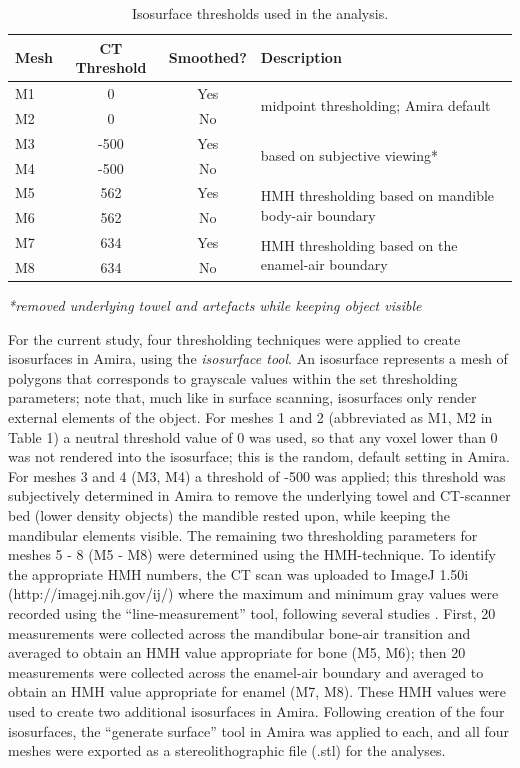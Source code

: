 \documentclass[review]{elsarticle}
\begin{document}
\begin{table}[tbh]\centering
\footnotesize
\caption{Isosurface thresholds used in the analysis.}
\centering
\begin{tabular}{lccp{6cm}}
\hline
Mesh & CT Threshold & Smoothed? & Description\\
\hline
M1 & 0 & Yes & \multirow{2}{5cm}{midpoint thresholding; Amira default}\\
M2 & 0 & No & \\
M3 & -500 & Yes & \multirow{2}{5cm}{based on subjective viewing*}\\
M4 & -500 & No & \\
M5 & 562 & Yes & \multirow{2}{5cm}{HMH thresholding based on mandible body-air boundary}\\
M6 & 562 & No & \\
M7 & 634 & Yes & \multirow{2}{5cm}{HMH thresholding based on the enamel-air boundary}\\
M8 & 634 & No & \\
\hline
\end{tabular}
\textit{*removed underlying towel and artefacts while keeping object visible }
\label{tab:Tbl1}
\end{table}

For the current study, four thresholding techniques were applied to create isosurfaces in Amira, using the \textit{isosurface tool}. An isosurface represents a mesh of polygons that corresponds to grayscale values within the set thresholding parameters; note that, much like in surface scanning, isosurfaces only render external elements of the object. For meshes 1 and 2 (abbreviated as M1, M2 in Table 1) a neutral threshold value of 0 was used, so that any voxel lower than 0 was not rendered into the isosurface; this is the random, default setting in Amira. For meshes 3 and 4 (M3, M4) a threshold of -500 was applied; this threshold was subjectively determined in Amira to remove the underlying towel and CT-scanner bed (lower density objects) the mandible rested upon, while keeping the mandibular elements visible. The remaining two thresholding parameters for meshes 5 - 8 (M5 - M8) were determined using the HMH-technique. To identify the appropriate HMH numbers, the CT scan was uploaded to ImageJ 1.50i  (http://imagej.nih.gov/ij/) where the maximum and minimum gray values were recorded using the “line-measurement” tool, following several studies \citep{RN5883,RN5882}. First, 20 measurements were collected across the mandibular bone-air transition and averaged to obtain an HMH value appropriate for bone (M5, M6); then 20 measurements were collected across the enamel-air boundary and averaged to obtain an HMH value appropriate for enamel (M7, M8). These HMH values were used to create two additional isosurfaces in Amira. Following creation of the four isosurfaces, the “generate surface” tool in Amira was applied to each, and all four meshes were exported as a stereolithographic file (.stl) for the analyses. 
\end{document}
